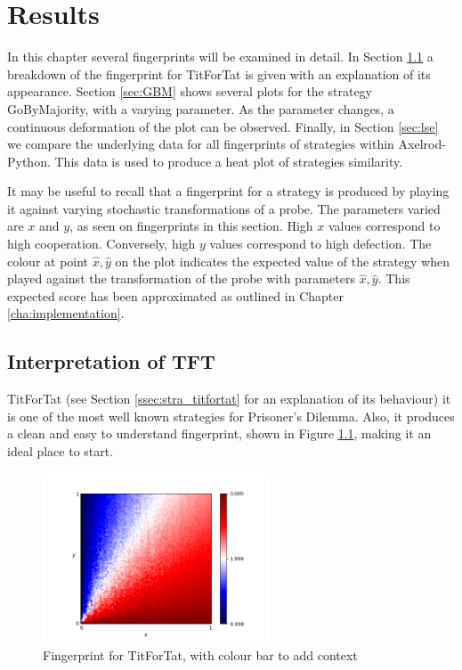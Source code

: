 
\chapter{Results}\label{cha:results}

In this chapter several fingerprints will be examined in detail.
In Section \ref{sec:tft} a breakdown of the fingerprint for TitForTat is given with an explanation of its appearance.
Section \ref{sec:GBM} shows several plots for the strategy GoByMajority, with a varying parameter.
As the parameter changes, a continuous deformation of the plot can be observed.
Finally, in Section \ref{sec:lse} we compare the underlying data for all fingerprints of strategies within Axelrod-Python.
This data is used to produce a heat plot of strategies similarity.

It may be useful to recall that a fingerprint for a strategy is produced by playing it against varying stochastic transformations of a probe.
The parameters varied are $x$ and $y$, as seen on fingerprints in this section.
High $x$ values correspond to high cooperation.
Conversely, high $y$ values correspond to high defection.
The colour at point $\hat{x}, \hat{y}$ on the plot indicates the expected value of the strategy when played against the transformation of the probe with parameters $\hat{x}, \hat{y}$.
This expected score has been approximated as outlined in Chapter \ref{cha:implementation}.


\section{Interpretation of TFT}\label{sec:tft}
TitForTat (see Section \ref{ssec:stra_titfortat} for an explanation of its behaviour) it is one of the most well known strategies for Prisoner's Dilemma.
Also, it produces a clean and easy to understand fingerprint, shown in Figure \ref{fig:TFT}, making it an ideal place to start.

\begin{figure}[hbtp!]
\centering
\includegraphics[width = 0.6\textwidth]{../img/Numerical/Tit_For_Tat.png}
\caption{Fingerprint for TitForTat, with colour bar to add context}
\label{fig:TFT}
\end{figure}


